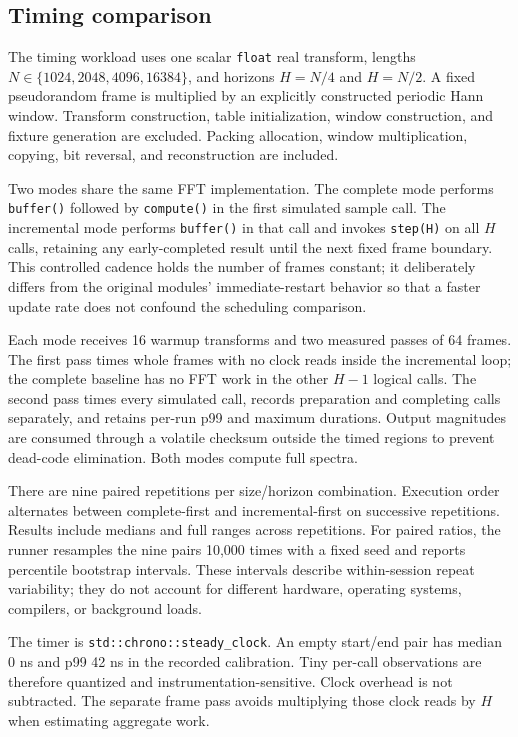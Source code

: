 \documentclass[11pt,letterpaper]{article}
\newcommand{\code}[1]{\texttt{#1}}
\begin{document}
\subsection{Timing comparison}
The timing workload uses one scalar \code{float} real transform, lengths
$N\in\{1024,2048,4096,16384\}$, and horizons $H=N/4$ and $H=N/2$. A fixed
pseudorandom frame is multiplied by an explicitly constructed periodic Hann
window. Transform construction, table initialization, window construction, and
fixture generation are excluded. Packing allocation, window multiplication,
copying, bit reversal, and reconstruction are included.

Two modes share the same FFT implementation. The complete mode performs
\code{buffer()} followed by \code{compute()} in the first simulated sample
call. The incremental mode performs \code{buffer()} in that call and invokes
\code{step(H)} on all $H$ calls, retaining any early-completed result until the
next fixed frame boundary. This controlled cadence holds the number of frames
constant; it deliberately differs from the original modules' immediate-restart behavior
so that a faster update rate does not confound the scheduling comparison.

Each mode receives 16 warmup transforms and two measured passes of 64 frames.
The first pass times whole frames with no clock reads inside the incremental
loop; the complete baseline has no FFT work in the other $H-1$ logical calls.
The second pass times every simulated call, records preparation and completing
calls separately, and retains per-run p99 and maximum durations. Output
magnitudes are consumed through a volatile checksum outside the timed regions
to prevent dead-code elimination. Both modes compute full spectra.

There are nine paired repetitions per size/horizon combination. Execution order
alternates between complete-first and incremental-first on successive
repetitions. Results include medians and full ranges across repetitions. For
paired ratios, the runner resamples the nine pairs 10,000 times with a fixed
seed and reports percentile bootstrap intervals. These intervals describe
within-session repeat variability; they do not account for different hardware,
operating systems, compilers, or background loads.

The timer is \code{std::chrono::steady\_clock}. An empty start/end pair has median
0 ns and p99 42 ns in the recorded calibration. Tiny per-call observations are
therefore quantized and instrumentation-sensitive. Clock overhead is not
subtracted. The separate frame pass avoids multiplying those clock reads by
$H$ when estimating aggregate work.
\end{document}

